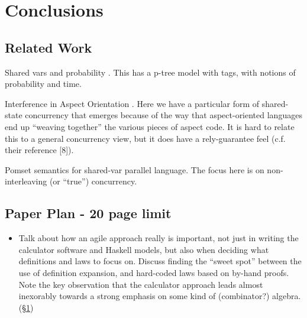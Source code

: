 \section{Conclusions}\label{sec:Conc}

\subsection{Related Work}

Shared  vars and probability \cite{DBLP:conf/utp/ZhuSHQ12}.
This has a p-tree model with tags, with notions of probability and time.

Interference in Aspect Orientation \cite{DBLP:conf/utp/ChenYD10}.
Here we have a particular form of shared-state concurrency
that emerges because of the way that aspect-oriented languages
end up ``weaving together'' the various pieces of aspect code.
It is hard to relate this to a general concurrency view,
but it does have a rely-guarantee feel (c.f. their reference [8]).

Pomset semantics for shared-var parallel language\cite{DBLP:conf/utp/ZhaoWZ10}.
The focus here is on non-interleaving (or ``true'') concurrency.

\subsection*{Paper Plan - 20 page limit}

\begin{itemize}
  \item
    Talk about how an agile approach really is important,
    not just in writing the calculator software and Haskell models,
    but also when deciding what definitions and laws to focus on.
    Discuss finding the ``sweet spot'' between the use of definition
    expansion, and hard-coded laws based on by-hand proofs.
    Note the key observation that the calculator approach
    leads almost inexorably towards a strong emphasis
    on some kind of (combinator?) algebra. (\S\ref{sec:Conc})
\end{itemize}
